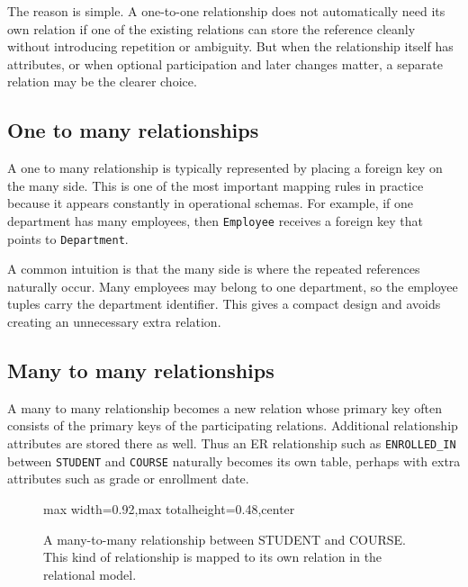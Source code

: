 \documentclass[11pt,a4paper,openany]{book}
\newcommand{\keyattr}[1]{\underline{#1}}
\begin{document}
The reason is simple. A one-to-one relationship does not automatically need its own relation if one of the existing relations can store the reference cleanly without introducing repetition or ambiguity. But when the relationship itself has attributes, or when optional participation and later changes matter, a separate relation may be the clearer choice.

\subsection{One to many relationships}
A one to many relationship is typically represented by placing a foreign key on the many side. This is one of the most important mapping rules in practice because it appears constantly in operational schemas. For example, if one department has many employees, then \texttt{Employee} receives a foreign key that points to \texttt{Department}.

A common intuition is that the many side is where the repeated references naturally occur. Many employees may belong to one department, so the employee tuples carry the department identifier. This gives a compact design and avoids creating an unnecessary extra relation.

\subsection{Many to many relationships}
A many to many relationship becomes a new relation whose primary key often consists of the primary keys of the participating relations. Additional relationship attributes are stored there as well. Thus an ER relationship such as \texttt{ENROLLED\_IN} between \texttt{STUDENT} and \texttt{COURSE} naturally becomes its own table, perhaps with extra attributes such as grade or enrollment date.

\begin{figure}[tbp]
\centering
\begin{adjustbox}{max width=0.92\linewidth,max totalheight=0.48\textheight,center}
\end{adjustbox}
\caption{A many-to-many relationship between STUDENT and COURSE. This kind of relationship is mapped to its own relation in the relational model.}
\label{fig:rel-many-many-rule}
\end{figure}
\end{document}
